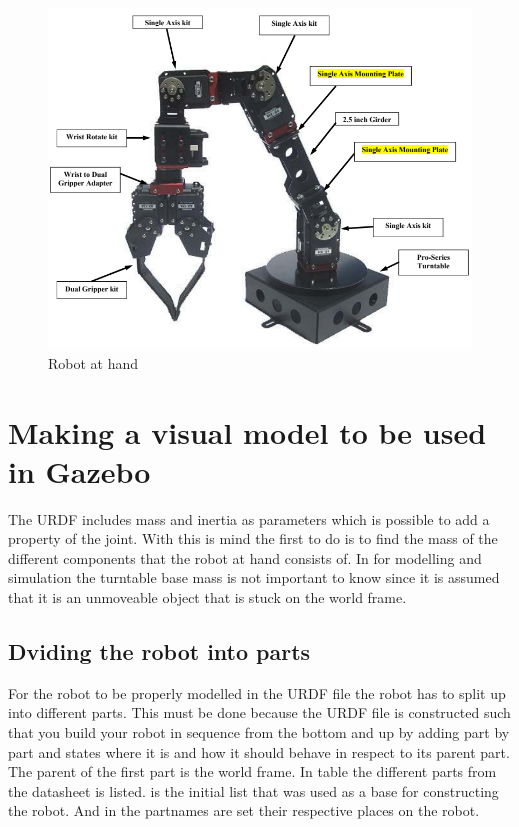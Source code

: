 \begin{figure}[htbp]
  \centering
  \includegraphics[width=.7\textwidth]{img/robotAH.png}
  \caption{Robot at hand}
  \label{fig:robotAH}
\end{figure}


\section{Making a visual model to be used in Gazebo}
The URDF includes mass and inertia as parameters which is possible to add a property of the joint. With this is mind the first to do is to find the mass of the different components that the robot at hand consists of. In  for modelling and simulation the turntable base mass is not important to know since it is assumed that it is an unmoveable object that is stuck on the world frame. \\

\subsection{Dviding the robot into parts}
For the robot to be properly modelled in the URDF file the robot has to split up into different parts. This must be done because the URDF file is constructed such that you build your robot in sequence from the bottom and up by adding part by part and states where it is and how it should behave in respect to its parent part. The parent of the first part is the world frame. In table  the different parts from the datasheet is listed.  is the initial list that was used as a base for constructing the robot. And in  the partnames are set their respective places on the robot. 

